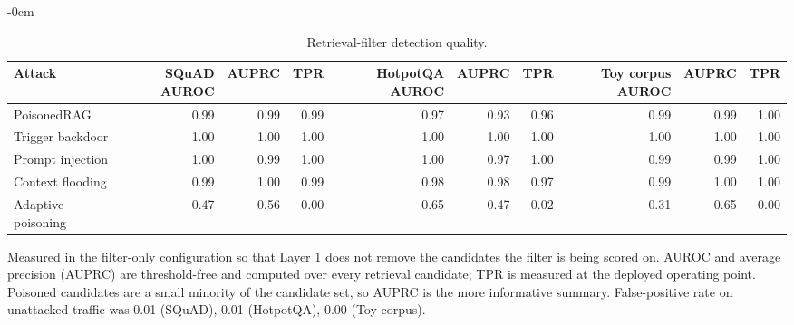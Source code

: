 \begin{table}[t]
\begin{adjustwidth}{-\extralength}{0cm}
\centering
\footnotesize
\setlength{\tabcolsep}{3pt}
\caption{Retrieval-filter detection quality.\label{tab:detection}}
\begin{tabular}{lrrrrrrrrr}
\toprule
\textbf{Attack} & \textbf{SQuAD AUROC} & \textbf{AUPRC} & \textbf{TPR} & \textbf{HotpotQA AUROC} & \textbf{AUPRC} & \textbf{TPR} & \textbf{Toy corpus AUROC} & \textbf{AUPRC} & \textbf{TPR}\\
\midrule
PoisonedRAG & 0.99 & 0.99 & 0.99 & 0.97 & 0.93 & 0.96 & 0.99 & 0.99 & 1.00\\
Trigger backdoor & 1.00 & 1.00 & 1.00 & 1.00 & 1.00 & 1.00 & 1.00 & 1.00 & 1.00\\
Prompt injection & 1.00 & 0.99 & 1.00 & 1.00 & 0.97 & 1.00 & 0.99 & 0.99 & 1.00\\
Context flooding & 0.99 & 1.00 & 0.99 & 0.98 & 0.98 & 0.97 & 0.99 & 1.00 & 1.00\\
Adaptive poisoning & 0.47 & 0.56 & 0.00 & 0.65 & 0.47 & 0.02 & 0.31 & 0.65 & 0.00\\
\bottomrule
\end{tabular}
\par\vspace{3pt}
\noindent\parbox{\linewidth}{\footnotesize Measured in the filter-only configuration so that Layer 1 does not remove the candidates the filter is being scored on. AUROC and average precision (AUPRC) are threshold-free and computed over every retrieval candidate; TPR is measured at the deployed operating point. Poisoned candidates are a small minority of the candidate set, so AUPRC is the more informative summary. False-positive rate on unattacked traffic was 0.01 (SQuAD), 0.01 (HotpotQA), 0.00 (Toy corpus).}
\end{adjustwidth}
\end{table}
